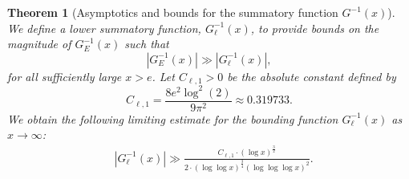 \documentclass[11pt,reqno,a4letter]{article}
\numberwithin{figure}{section}
\numberwithin{table}{section}
\theoremstyle{plain}
\newtheorem{theorem}{Theorem}
\numberwithin{theorem}{section}
\theoremstyle{definition}
\newcommand{\NBRef}[1]{}
\newcommand{\SuccSim}[0]{\overset{_{\scriptsize{\blacktriangle}}}{\succsim}}
\renewcommand{\SuccSim}[0]{\ensuremath{\gg}}
\begin{document}
\begin{theorem}[Asymptotics and bounds for the summatory function $G^{-1}(x)$] 
\label{theorem_gInv_GeneralAsymptoticsForms}
We define a lower summatory function, $G_{\ell}^{-1}(x)$, 
to provide bounds on the magnitude of $G_E^{-1}(x)$ such that 
$$|G_E^{-1}(x)| \gg |G_{\ell}^{-1}(x)|,$$ 
for all sufficiently large $x > e$. 
Let $C_{\ell,1} > 0$ be the absolute constant defined by 
\[
C_{\ell,1} = \frac{8 e^2 \log^2(2)}{9 \pi^2} \approx 0.319733.  
\]
We obtain the following limiting estimate for the bounding function 
$G_{\ell}^{-1}(x)$ as $x \rightarrow \infty$:   
\begin{align*} 
 & \left\lvert G_{\ell}^{-1}\left(x\right) \right\rvert
     \SuccSim 
     \frac{C_{\ell,1} \cdot (\log x)^{\frac{3}{2}}}{2 \cdot  
     (\log\log x)^{\frac{3}{4}} (\log\log\log x)^2}. 
\end{align*} 
\end{theorem} 
\NBRef{A10-2020.04-26} 
\end{document}
